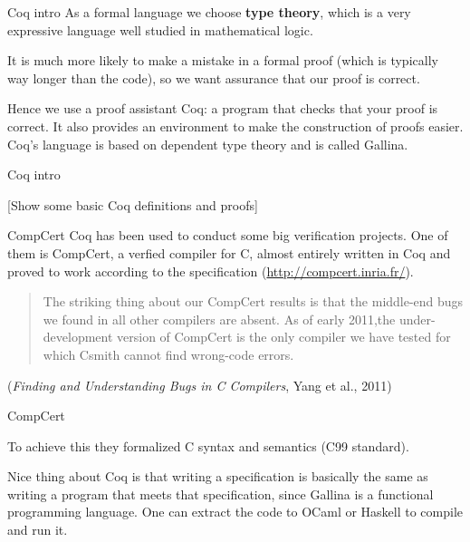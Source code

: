 \documentclass{beamer}
\begin{document}
\begin{frame}{Coq intro}
  As a formal language we choose {\bf type theory}, which is a very expressive language well studied in mathematical logic.
  \smallskip
  
  It is much more likely to make a mistake in a formal proof (which is typically way longer than the code), so we want assurance that our proof is correct.
  \smallskip
  
  Hence we use a proof assistant Coq: a program that checks that your proof is correct. It also provides an environment to make the construction of proofs easier. Coq's language is based on dependent type theory and is called Gallina.
  
\end{frame}
\begin{frame}{Coq intro}
  
 [Show some basic Coq definitions and proofs]
  
  \end{frame}

  \begin{frame}{CompCert}
    Coq has been used to conduct some big verification projects. One of them is CompCert, a verfied compiler for C, almost entirely written in Coq and proved to work according to the specification (\url{http://compcert.inria.fr/}).

    \begin{quote}
      The striking thing about our CompCert results is that the middle-end bugs we found in all other compilers are absent. As of early 2011,the under-development version of CompCert is the only compiler we have tested for which Csmith cannot find wrong-code errors.
    \end{quote} ({\it Finding and Understanding Bugs in C Compilers}, Yang et al., 2011)

  \end{frame}
  \begin{frame}{CompCert}
    
 To achieve this they formalized C syntax and semantics (C99 standard).

    \bigskip
    
    Nice thing about Coq is that writing a specification is basically the same as writing a program that meets that specification, since Gallina is a functional programming language. One can extract the code to OCaml or Haskell to compile and run it.

    
    
\end{frame}
\end{document}
